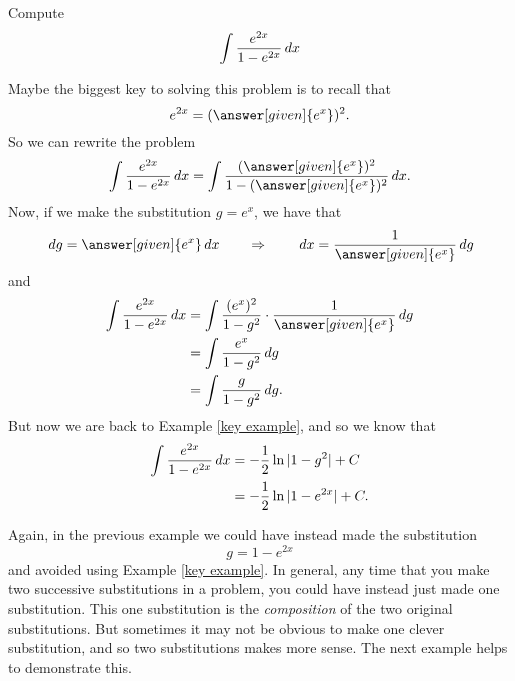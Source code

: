 \documentclass{ximera}
\begin{document}
\begin{example}
Compute
\[
\int \frac{e^{2x}}{1 - e^{2x}} \,d x
\]
\begin{explanation}
Maybe the biggest key to solving this problem is to recall that
\[
e^{2x} = (\answer[given]{e^x})^2.
\]
So we can rewrite the problem
\[
\int \frac{e^{2x}}{1 - e^{2x}} \d x = \int \frac{(\answer[given]{e^x})^2}{1 - (\answer[given]{e^x})^2} \d x.
\]
Now, if we make the substitution $g = e^x$, we have that
\[
\d g = \answer[given]{e^x} \d x 	\qquad 	\Rightarrow	\qquad	\d x = \frac{1}{\answer[given]{e^x}} \d g
\]
and
\begin{align*}
\int \frac{e^{2x}}{1 - e^{2x}} \d x &= \int \frac{(e^x)^2}{1 - g^2} \cdot \frac{1}{\answer[given]{e^x}} \d g  \\
&= \int \frac{e^x}{1-g^2} \d g  \\
&= \int \frac{g}{1-g^2} \d g.
\end{align*}
But now we are back to Example \ref{key example}, and so we know that
\begin{align*}
\int \frac{e^{2x}}{1 - e^{2x}} \,d x &= - \frac{1}{2} \ln|1-g^2| + C  \\
&= - \frac{1}{2} \ln|1 - e^{2x}| + C.
\end{align*}
\end{explanation}
\end{example}


Again, in the previous example we could have instead made the substitution 
\[
g = 1 - e^{2x}
\]
and avoided using Example \ref{key example}.  
In general, any time that you make two successive substitutions in a problem, you could have instead just made one substitution.  
This one substitution is the \textit{composition} of the two original substitutions.  
But sometimes it may not be obvious to make one clever substitution, and so two substitutions makes more sense.  
The next example helps to demonstrate this.
\end{document}
